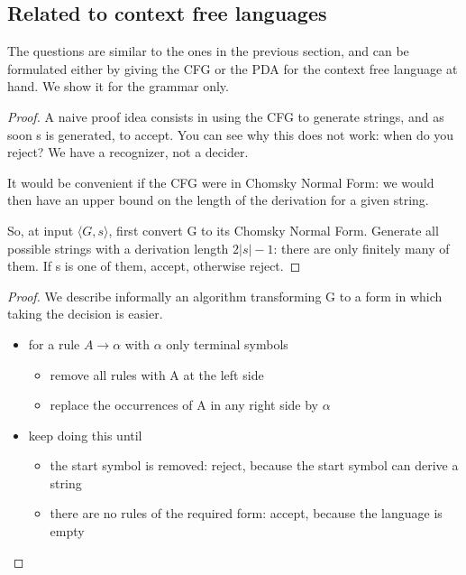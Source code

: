 \subsection{Related to context free languages}

The questions are similar to the ones in the previous section, and can
be formulated either by giving the CFG or the PDA for the context free
language at hand. We show it for the grammar only.


\begin{proof}
A naive proof idea consists in using the CFG to generate strings, and
as soon s is generated, to accept. You can see why this does not work:
when do you reject? We have a recognizer, not a decider. 

It would be convenient if the CFG were in Chomsky Normal Form: we
would then have an upper bound on the length of the derivation for a
given string.

So, at input $\langle G,s \rangle$, first convert G to its Chomsky
Normal Form. Generate all possible strings with a derivation length
$2|s|-1$: there are only finitely many of them. If s is one of them,
accept, otherwise reject.
\end{proof}

\begin{proof}
We describe informally an algorithm transforming G to a form in which
taking the decision is easier.
\begin{itemize}
\item
for a rule $A \rightarrow \alpha$ with $\alpha$ only terminal symbols
\begin{itemize}
\item remove all rules with A at the left side
\item replace the occurrences of A in any right side by $\alpha$
\end{itemize}


\item
keep doing this until 
\begin{itemize}
\item the start symbol is removed: reject, because the start symbol
  can derive a string
\item there are no rules of the required form: accept, because the
  language is empty
\end{itemize}
\end{itemize}
\end{proof}

